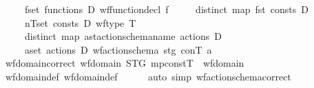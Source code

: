 \begin{isabellebody}
\ \ \ \ {\isasymand}\ {\isacharparenleft}{\kern0pt}{\isasymforall}f{\isasymin}set\ {\isacharparenleft}{\kern0pt}functions\ D{\isacharparenright}{\kern0pt}{\isachardot}{\kern0pt}\ wf{\isacharunderscore}{\kern0pt}function{\isacharunderscore}{\kern0pt}decl\ f{\isacharparenright}{\kern0pt}\isanewline
\ \ \ \ {\isasymand}\ distinct\ {\isacharparenleft}{\kern0pt}map\ fst\ {\isacharparenleft}{\kern0pt}consts\ D{\isacharparenright}{\kern0pt}{\isacharparenright}{\kern0pt}\isanewline
\ \ \ \ {\isasymand}\ {\isacharparenleft}{\kern0pt}{\isasymforall}{\isacharparenleft}{\kern0pt}n{\isacharcomma}{\kern0pt}T{\isacharparenright}{\kern0pt}{\isasymin}set\ {\isacharparenleft}{\kern0pt}consts\ D{\isacharparenright}{\kern0pt}{\isachardot}{\kern0pt}\ wf{\isacharunderscore}{\kern0pt}type\ T{\isacharparenright}{\kern0pt}\isanewline
\ \ \ \ {\isasymand}\ distinct\ {\isacharparenleft}{\kern0pt}map\ ast{\isacharunderscore}{\kern0pt}action{\isacharunderscore}{\kern0pt}schema{\isachardot}{\kern0pt}name\ {\isacharparenleft}{\kern0pt}actions\ D{\isacharparenright}{\kern0pt}{\isacharparenright}{\kern0pt}\isanewline
\ \ \ \ {\isasymand}\ {\isacharparenleft}{\kern0pt}{\isasymforall}a{\isasymin}set\ {\isacharparenleft}{\kern0pt}actions\ D{\isacharparenright}{\kern0pt}{\isachardot}{\kern0pt}\ wf{\isacharunderscore}{\kern0pt}action{\isacharunderscore}{\kern0pt}schema{\isacharprime}{\kern0pt}\ stg\ conT\ a{\isacharparenright}{\kern0pt}\isanewline
\ \ \ \ {\isachardoublequoteclose}\isanewline
\isanewline
\ \ \isamarkupfalse%
\ wf{\isacharunderscore}{\kern0pt}domain{\isacharprime}{\kern0pt}{\isacharunderscore}{\kern0pt}correct{\isacharcolon}{\kern0pt}\ {\isachardoublequoteopen}wf{\isacharunderscore}{\kern0pt}domain{\isacharprime}{\kern0pt}\ STG\ mp{\isacharunderscore}{\kern0pt}constT\ {\isacharequal}{\kern0pt}\ wf{\isacharunderscore}{\kern0pt}domain{\isachardoublequoteclose}\isanewline
%
\isadelimproof
\ \ \ \ %
\endisadelimproof
%
\isatagproof
{}\isamarkupfalse%
\ wf{\isacharunderscore}{\kern0pt}domain{\isacharunderscore}{\kern0pt}def\ wf{\isacharunderscore}{\kern0pt}domain{\isacharprime}{\kern0pt}{\isacharunderscore}{\kern0pt}def\isanewline
\ \ \ \ \isamarkupfalse%
\ {\isacharparenleft}{\kern0pt}auto\ simp{\isacharcolon}{\kern0pt}\ wf{\isacharunderscore}{\kern0pt}action{\isacharunderscore}{\kern0pt}schema{\isacharprime}{\kern0pt}{\isacharunderscore}{\kern0pt}correct{\isacharparenright}{\kern0pt}%
\endisatagproof
{\isafoldproof}%
%
\isadelimproof
\isanewline
%
\endisadelimproof
\isanewline
\isanewline
{}\isamarkupfalse%

\end{isabellebody}
